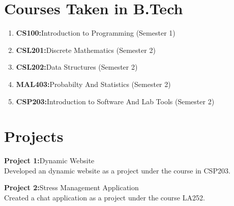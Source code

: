\documentclass{article}
\begin{document}
	\section*{Courses Taken in B.Tech}
	\begin{enumerate}
		\item \textbf{CS100:}{Introduction to Programming} (Semester 1)
		\item \textbf{CSL201:}{Discrete Mathematics} (Semester 2)
		\item \textbf{CSL202:}{Data Structures} (Semester 2)
		\item \textbf{MAL403:}{Probabilty And Statistics} (Semester 2)
		\item \textbf{CSP203:}{Introduction to Software And Lab Tools} (Semester 2)
	\end{enumerate}

	\section*{Projects}
	\textbf{Project 1:}{Dynamic Website} \\
	Developed an dynamic website as a project under the course in CSP203.
	
	\textbf{Project 2:}{Stress Management Application} \\
	Created a chat application as a project under the course LA252.
	
	
\end{document}
